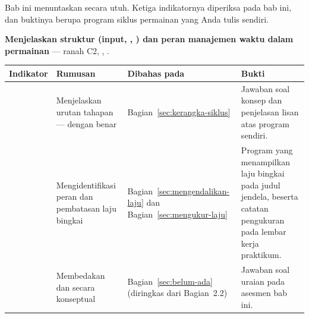 \begin{subcpmkbox}
Bab ini menuntaskan  secara utuh. Ketiga indikatornya diperiksa
pada bab ini, dan buktinya berupa program siklus permainan yang Anda tulis
sendiri.

\vspace{0.5em}
\textbf{ Menjelaskan struktur  (input,
, ) dan peran manajemen waktu dalam
permainan} --- ranah C2, , .

\vspace{0.5em}
{\setlength{\tabcolsep}{4pt}\footnotesize%
\begin{tabularx}{\textwidth}{@{}C{1.9cm} L{4.0cm} L{2.5cm} Y@{}}
\toprule
\headrow \textbf{Indikator} & \textbf{Rumusan} & \textbf{Dibahas pada} & \textbf{Bukti} \\
\midrule
{} & Menjelaskan urutan tahapan
---- dengan benar &
Bagian~\ref{sec:kerangka-siklus} &
Jawaban soal konsep dan penjelasan lisan atas program sendiri. \\
\addlinespace
{} & Mengidentifikasi peran  dan pembatasan
laju bingkai &
Bagian~\ref{sec:mengendalikan-laju} dan Bagian~\ref{sec:mengukur-laju} &
Program yang menampilkan laju bingkai pada judul jendela, beserta catatan
pengukuran pada lembar kerja praktikum. \\
\addlinespace
{} & Membedakan  dan 
secara konseptual &
Bagian~\ref{sec:belum-ada} (diringkas dari Bagian~2.2) &
Jawaban soal uraian pada asesmen bab ini. \\
\bottomrule
\end{tabularx}}
\end{subcpmkbox}
